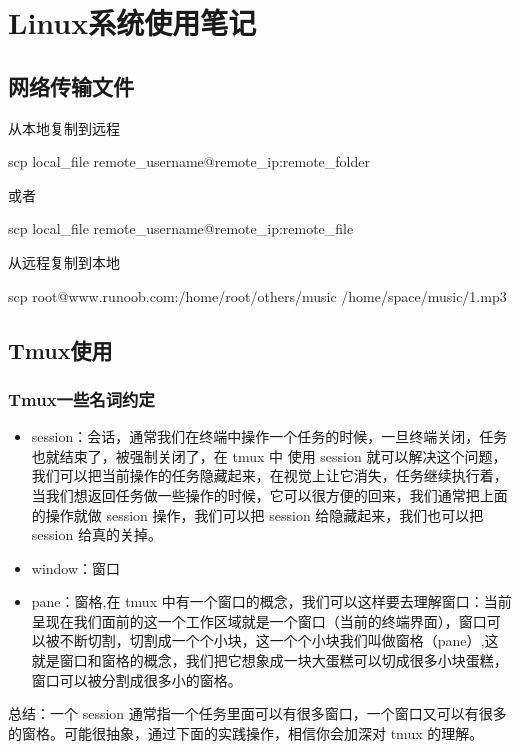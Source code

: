 \section{Linux系统使用笔记}
\subsection{网络传输文件}
从本地复制到远程
\begin{commandbox}
scp local_file remote_username@remote_ip:remote_folder 
\end{commandbox}
或者 
\begin{commandbox}
scp local_file remote_username@remote_ip:remote_file 
\end{commandbox}

从远程复制到本地
\begin{commandbox}
scp root@www.runoob.com:/home/root/others/music /home/space/music/1.mp3 
\end{commandbox}

\subsection{Tmux使用}
\subsubsection{Tmux一些名词约定}
\begin{itemize}
\item session：会话，通常我们在终端中操作一个任务的时候，一旦终端关闭，任务也就结束了，被强制关闭了，在 tmux 中 使用 session 就可以解决这个问题，我们可以把当前操作的任务隐藏起来，在视觉上让它消失，任务继续执行着，当我们想返回任务做一些操作的时候，它可以很方便的回来，我们通常把上面的操作就做 session 操作，我们可以把 session 给隐藏起来，我们也可以把 session 给真的关掉。
\item window：窗口
\item pane：窗格,在 tmux 中有一个窗口的概念，我们可以这样要去理解窗口：当前呈现在我们面前的这一个工作区域就是一个窗口（当前的终端界面），窗口可以被不断切割，切割成一个个小块，这一个个小块我们叫做窗格（pane）,这就是窗口和窗格的概念，我们把它想象成一块大蛋糕可以切成很多小块蛋糕，窗口可以被分割成很多小的窗格。
\end{itemize}
总结：一个 session 通常指一个任务里面可以有很多窗口，一个窗口又可以有很多的窗格。可能很抽象，通过下面的实践操作，相信你会加深对 tmux 的理解。
